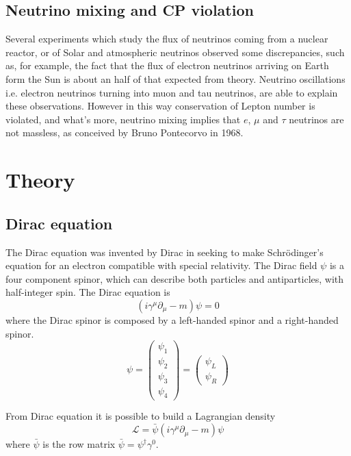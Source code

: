 \documentclass{subnucbo}
\begin{document}
\subsection{Neutrino mixing and CP violation}
Several experiments which study the flux of neutrinos coming from a nuclear reactor, or of Solar and atmospheric neutrinos observed some discrepancies, such as,  for example, the fact that the flux of electron neutrinos arriving on Earth form the Sun is about an half of that expected from theory.
Neutrino oscillations i.e. electron neutrinos turning into muon and tau neutrinos, are able to explain these observations. However in this way conservation of Lepton number is violated, and what's more, neutrino mixing implies that $e$, $\mu$ and $\tau$ neutrinos are not massless, as conceived by Bruno Pontecorvo in 1968. %

\section{Theory}

\subsection{Dirac equation}
The Dirac equation was invented by Dirac in seeking to make Schrödinger's equation for an electron compatible with special relativity. The Dirac field $\psi$ is a four component spinor, which can describe both particles and antiparticles, with half-integer spin.
The Dirac equation is
\begin{equation}
\label{eq:dir}
(i\gamma^{\mu}\partial_{\mu}-m)\psi=0
\end{equation}
where the Dirac spinor is composed by a left-handed spinor and a right-handed spinor.
\begin{equation} 
\psi=\begin{pmatrix}\psi_1\\ \psi_2 \\ \psi_3 \\ \psi_4 \end{pmatrix}=\begin{pmatrix}\psi_L\\ \psi_R \end{pmatrix}
\end{equation}

From Dirac equation it is possible to build a Lagrangian density
\begin{equation}
\label{eq:DirLag}
\mathcal{L}=\bar{\psi}(i\gamma^{\mu}\partial_{\mu}-m)\psi
\end{equation}
where $\bar{\psi}$ is the row matrix $\bar{\psi}=\psi^{\dagger}\gamma^0$.
\end{document}
